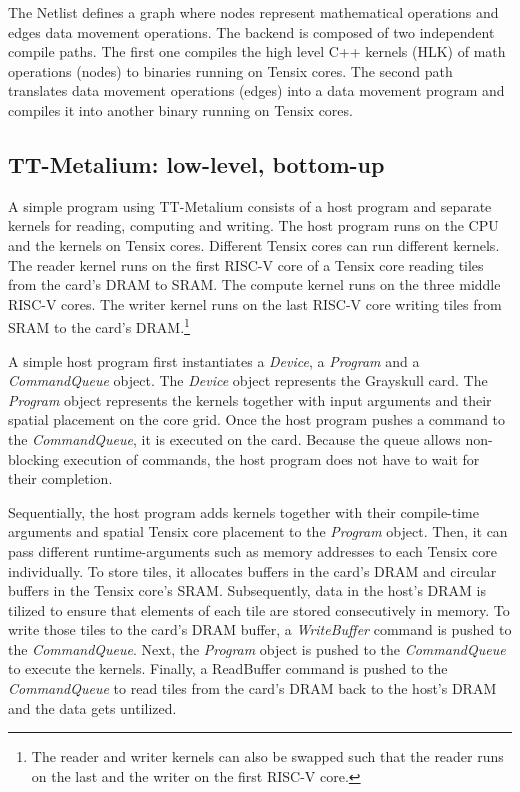 \documentclass[conference]{IEEEtran}
\begin{document}
The Netlist defines a graph where nodes represent mathematical operations and edges data movement operations. The backend is composed of two independent compile paths. The first one compiles the high level C++ kernels (HLK) of math operations (nodes) to binaries running on Tensix cores. The second path translates data movement operations (edges) into a data movement program and compiles it into another binary running on Tensix cores.

\subsection{TT-Metalium: low-level, bottom-up}
A simple program using TT-Metalium consists of a host program and separate kernels for reading, computing and writing. The host program runs on the CPU and the kernels on Tensix cores. Different Tensix cores can run different kernels. The reader kernel runs on the first RISC-V core of a Tensix core reading tiles from the card's DRAM to SRAM. The compute kernel runs on the three middle RISC-V cores. The writer kernel runs on the last RISC-V core writing tiles from SRAM to the card's DRAM.\footnote{The reader and writer kernels can also be swapped such that the reader runs on the last and the writer on the first RISC-V core.}

A simple host program first instantiates a \textit{Device}, a \textit{Program} and a \textit{CommandQueue} object. The \textit{Device} object represents the Grayskull card. The \textit{Program} object represents the kernels together with input arguments and their spatial placement on the core grid. Once the host program pushes a command to the \textit{CommandQueue}, it is executed on the card. Because the queue allows non-blocking execution of commands, the host program does not have to wait for their completion. 

Sequentially, the host program adds kernels together with their compile-time arguments and spatial Tensix core placement to the \textit{Program} object. Then, it can pass different runtime-arguments such as memory addresses to each Tensix core individually. To store tiles, it allocates buffers in the card's DRAM and circular buffers in the Tensix core's SRAM. Subsequently, data in the host's DRAM is tilized to ensure that elements of each tile are stored consecutively in memory. To write those tiles to the card's DRAM buffer, a \textit{WriteBuffer} command is pushed to the \textit{CommandQueue}. Next, the \textit{Program} object is pushed to the \textit{CommandQueue} to execute the kernels. Finally, a ReadBuffer command is pushed to the \textit{CommandQueue} to read tiles from the card's DRAM back to the host's DRAM and the data gets untilized.
\end{document}
